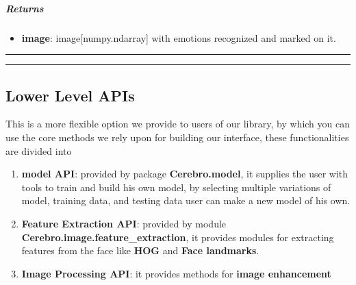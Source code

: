 \subparagraph{Returns}
\begin{changemargin}{0.5cm}{0cm}
\begin{itemize}[noitemsep,nolistsep]
	\item \textbf{image}: image[numpy.ndarray] with emotions recognized and marked on it.
\end{itemize}
\end{changemargin}

\begin{comment}
\subparagraph{Usage:}
\begin{changemargin}{0.5cm}{0cm}
\begin{itemize}
	\item import the module:
	\begin{lstlisting}[language=Python]
	from interface Import process_image as pi\end{lstlisting}
	
	\item call it:
	\begin{lstlisting}[language=Python]
	pi.mark_faces_emotions(image)\end{lstlisting}
\end{itemize}
\end{changemargin}
\end{comment}
\hrule\vspace{0.5mm}\hrule

\subsection{Lower Level APIs}
This is a more flexible option we provide to users of our library, by which you can use the core methods we rely upon for building our interface, these functionalities are divided into
\begin{enumerate}
	\item \textbf{model API}: provided by package \textbf{Cerebro.model}, it supplies the user with tools to train and build his own model, by selecting multiple variations of model, training data, and testing data user can make a new model of his own. 
	\item \textbf{Feature Extraction API}: provided by module \textbf{Cerebro.image.feature\_extraction}, it provides modules for extracting features from the face like \textbf{HOG} and \textbf{Face landmarks}.
	\item \textbf{Image Processing API}: it provides methods for \textbf{image enhancement}
\end{enumerate}


